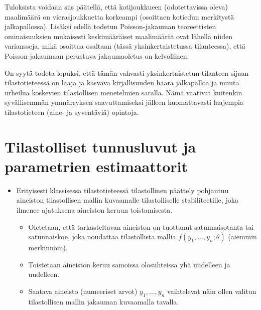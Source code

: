 \documentclass[
]{book}
\providecommand{\tightlist}{%
  \setlength{\itemsep}{0pt}\setlength{\parskip}{0pt}}
\begin{document}
\begin{eblock}{}
Tuloksista voidaan siis päätellä, että kotijoukkueen (odotettavissa oleva) maalimäärä on vierasjoukkuetta korkeampi (osoittaen kotiedun merkitystä jalkapallossa). Lisäksi edellä todetun Poisson-jakauman teoreettisten ominaisuuksien mukaisesti keskimääräiset maalimäärät ovat lähellä niiden variansseja, mikä osoittaa osaltaan (tässä yksinkertaistetussa tilanteessa), että Poisson-jakaumaan perustuva jakaumaoletus on kelvollinen.

On syytä todeta lopuksi, että tämän vahvasti yksinkertaistetun tilanteen sijaan tilastotieteessä on laaja ja kasvava kirjallisuuden haara jalkapalloa ja muuta urheilua koskevien tilastollisen menetelmien saralla. Nämä vaativat kuitenkin syvällisemmän ymmärryksen saavuttamiseksi jälleen huomattavasti laajempia tilastotieteen (aine- ja syventäviä) opintoja.

\end{eblock}

\hypertarget{alaluku83}{%
\section{Tilastolliset tunnusluvut ja parametrien estimaattorit}\label{alaluku83}}

\begin{itemize}
\tightlist
\item
  Erityisesti klassisessa tilastotieteessä tilastollinen päättely pohjautuu aineiston tilastollisen mallin kuvaamalle tilastolliselle stabiliteetille, joka ilmenee ajatuksena aineiston keruun toistamisesta.

  \begin{itemize}
  \tightlist
  \item
    Oletetaan, että tarkasteltavan aineiston on tuottanut satunnaisotanta tai satunnaiskoe, joka noudattaa tilastollista mallia \(f(y_1, \ldots, y_n; \theta)\) (aiemmin merkinnöin).
  \item
    Toistetaan aineiston keruu samoissa olosuhteissa yhä uudelleen ja uudelleen.
  \item
    Saatava aineisto (numeeriset arvot) \(y_1, \ldots, y_n\) vaihtelevat näin ollen valitun tilastollisen mallin jakauman kuvaamalla tavalla.
  \end{itemize}
\end{itemize}
\end{document}
